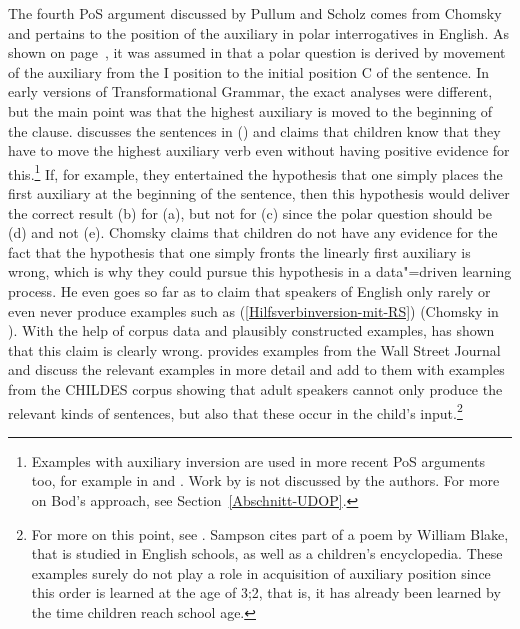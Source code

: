 The fourth PoS argument discussed by Pullum and Scholz comes from Chomsky and pertains to the
position of the auxiliary in polar interrogatives in English. As shown on page~\pageref{Seite-GB-Entscheidungsfragen-Englisch},
it was assumed in \gbt that a polar question is derived by movement of the auxiliary from the I position to the initial position C of
the sentence. In early versions of Transformational Grammar, the exact analyses were different, but the main point was that the
highest auxiliary is moved to the beginning of the clause. 
 \citet[--33]{Chomsky71a-u}
discusses the sentences in () and claims that children know that they have to move the highest auxiliary verb even without having
positive evidence for this.\footnote{
	Examples with auxiliary inversion are used in more recent PoS arguments too, for example in 
   and . Work by \citet{Bod2009a} is not discussed by the authors.
  For more on Bod's approach, see Section~\ref{Abschnitt-UDOP}.%
} If, for example, they entertained the hypothesis that one simply places the first auxiliary at the beginning of the sentence, then
this hypothesis would deliver the correct result (b) for (a), but not for (c) since the polar question should
be (d) and not (e).
\eal
{}
\zl
Chomsky claims that children do not have any evidence for the fact that the hypothesis that one
simply fronts the linearly first auxiliary is wrong, which is why they could pursue this hypothesis in a data"=driven learning process. He even goes so
far as to claim that speakers of English only rarely or even never produce examples such as (\ref{Hilfsverbinversion-mit-RS})
(Chomsky in
). 
With the help of corpus data and plausibly constructed examples, \citet{Pullum96a} has shown that this claim is clearly wrong.
 \citet{Pullum96a} provides examples from the Wall Street Journal and \citet{PS2002a} discuss the relevant examples in more detail
 and add to them with examples from the CHILDES corpus showing  that adult speakers cannot only produce the relevant
 kinds of sentences, but also that these occur in the child's input.\footnote{
For more on this point, see . Sampson cites part of a poem by William Blake, that is studied in English schools, as well as
a children's encyclopedia. These examples surely do not play a role in acquisition of auxiliary position since this order is learned at the age of
3;2, that is, it has already been learned by the time children reach school age.%
}
